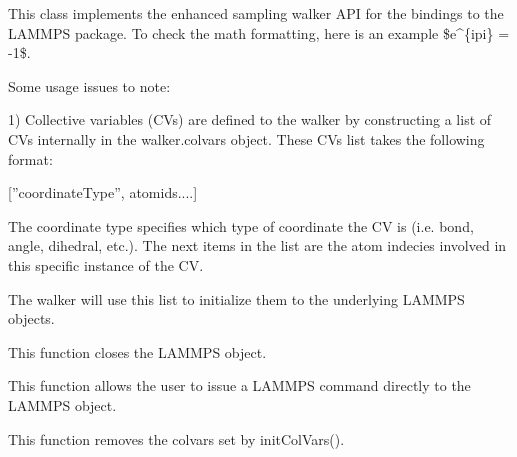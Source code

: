 \documentclass[letterpaper,10pt,english]{sphinxmanual}
\begin{document}
\begin{fulllineitems}
\label{src/src.doc:lammpsWalker.lammpsWalker}
This class implements the enhanced sampling walker API for the bindings to the LAMMPS package. To check the math formatting, here is an example \$e\textasciicircum{}\{ipi\} = -1\$.

Some usage issues to note:

1) Collective variables (CVs) are defined to the walker by constructing a list of
CVs internally in the walker.colvars object. These CVs list takes the following
format:

{[}''coordinateType'', atomids....{]}

The coordinate type specifies which type of coordinate the CV is 
(i.e. bond, angle, dihedral, etc.). The next items in the list are the atom 
indecies involved in this specific instance of the CV.

The walker will use this list to initialize them to the underlying LAMMPS objects.

\begin{fulllineitems}
\label{src/src.doc:lammpsWalker.lammpsWalker.close}
This function closes the LAMMPS object.

\end{fulllineitems}


\begin{fulllineitems}
\label{src/src.doc:lammpsWalker.lammpsWalker.command}
This function allows the user to issue a LAMMPS command directly to the
LAMMPS object.

\end{fulllineitems}


\begin{fulllineitems}
\label{src/src.doc:lammpsWalker.lammpsWalker.destroyColvars}
This function removes the colvars set by initColVars().

\end{fulllineitems}


\end{fulllineitems}
\end{document}
